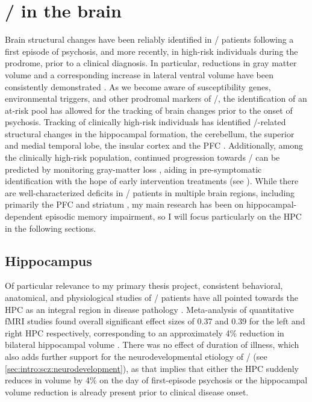 \section{\Scz/ in the brain}
\label{sec:intro:scz:brain}
Brain structural changes have been reliably identified in \scz/ patients following a first episode of psychosis, and more recently, in high-risk individuals during the prodrome, prior to a clinical diagnosis.
In particular, reductions in gray matter volume and a corresponding increase in lateral ventral volume have been consistently demonstrated \citep{Fusar-Poli2013, Shepherd2012}.
As we become aware of susceptibility genes, environmental triggers, and other prodromal markers of \scz/, the identification of an at-risk pool has allowed for the tracking of brain changes prior to the onset of psychosis.
Tracking of clinically high-risk individuals has identified \scz/-related structural changes in the hippocampal formation, the cerebellum, the superior and medial temporal lobe, the insular cortex and the \ac{PFC} \citep{Cannon2015, Millan2016}.
Additionally, among the clinically high-risk population, continued progression towards \scz/ can be predicted by monitoring gray-matter loss \citep{Tognin2014}, aiding in pre-symptomatic identification with the hope of early intervention treatments (see ).
While there are well-characterized deficits in \scz/ patients in multiple brain regions, including primarily the \ac{PFC} \citep{XXX} and striatum \citep{XXX}, my main research has been on hippocampal-dependent episodic memory impairment, so I will focus particularly on the \ac{HPC} in the following sections.

\subsection{Hippocampus}
\label{sec:intro:scz:hpc}
Of particular relevance to my primary thesis project, consistent behavioral, anatomical, and physiological studies of \scz/ patients have all pointed towards the HPC as an integral region in disease pathology \citep{Boyer2007, Bogerts1985, Jakob1986}.
Meta-analysis of quantitative \ac{fMRI} studies found overall significant effect sizes of 0.37 and 0.39 for the left and right \ac{HPC} respectively, corresponding to an approximately 4\% reduction in bilateral hippocampal volume \citep{Nelson1998}.
There was no effect of duration of illness, which also adds further support for the neurodevelopmental etiology of \scz/ (see \autoref{sec:intro:scz:neurodevelopment}), as that implies that either the \ac{HPC} suddenly reduces in volume by 4\% on the day of first-episode psychosis or the hippocampal volume reduction is already present prior to clinical disease onset. 

